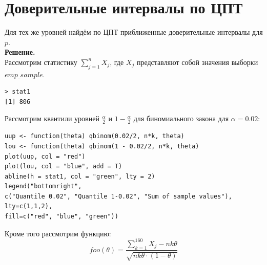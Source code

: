 \documentclass[14pt,a4paper]{scrartcl}
\begin{document}
\section{Доверительные интервалы по ЦПТ}\label{sec2}
Для тех же уровней найдём по ЦПТ приближенные доверительные интервалы для $p$.\\
\textbf{Решение.}\\
Рассмотрим статистику $\sum_{j=1}^{n}X_j$, где $X_j$ представляют собой значения выборки $emp\_sample$.
\begin{verbatim}
> stat1
[1] 806
\end{verbatim}
Рассмотрим квантили уровней $\frac{\alpha}{2}$ и $1 - \frac{\alpha}{2}$ для биномиального закона для $\alpha = 0.02$:
\begin{verbatim}
uup <- function(theta) qbinom(0.02/2, n*k, theta)
lou <- function(theta) qbinom(1 - 0.02/2, n*k, theta)
plot(uup, col = "red")
plot(lou, col = "blue", add = T)
abline(h = stat1, col = "green", lty = 2)
legend("bottomright", 
c("Quantile 0.02", "Quantile 1-0.02", "Sum of sample values"), 
lty=c(1,1,2), 
fill=c("red", "blue", "green"))
\end{verbatim}

Кроме того рассмотрим функцию:
\begin{equation*}
foo(\theta)=\frac{\sum\limits_{k=1}^{160} X_{j}-nk \theta}{\sqrt{nk \theta \cdot(1-\theta)}}
\end{equation*}
 \pagebreak

\begin{figure}[h]
\end{figure}
\begin{figure}[h]
\end{figure}
\end{document}
